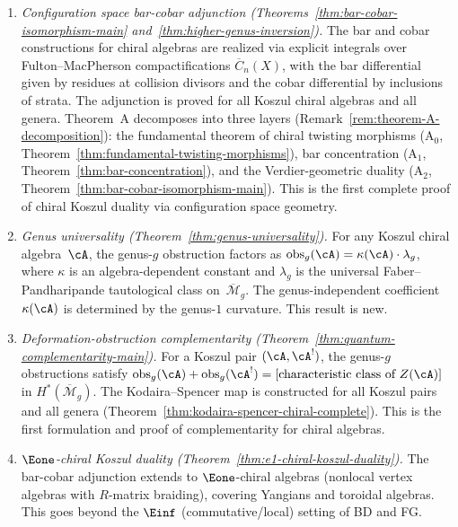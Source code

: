 \begin{enumerate}[label=\emph{(\arabic*)}]

\item \emph{Configuration space bar-cobar adjunction
  (Theorems~\ref{thm:bar-cobar-isomorphism-main}
  and~\ref{thm:higher-genus-inversion}).}
  The bar and cobar constructions for chiral algebras are realized
  via explicit integrals over Fulton--MacPherson compactifications
  $\overline{C}_n(X)$, with the bar differential given by residues
  at collision divisors and the cobar differential by inclusions
  of strata.  The adjunction is proved for all Koszul chiral algebras
  and all genera.  Theorem~A decomposes into three layers
  (Remark~\ref{rem:theorem-A-decomposition}):
  the fundamental theorem of chiral twisting morphisms
  ($\mathrm{A}_0$, Theorem~\ref{thm:fundamental-twisting-morphisms}),
  bar concentration
  ($\mathrm{A}_1$, Theorem~\ref{thm:bar-concentration}), and
  the Verdier-geometric duality
  ($\mathrm{A}_2$, Theorem~\ref{thm:bar-cobar-isomorphism-main}).
  This is the first complete proof of chiral Koszul
  duality via configuration space geometry.

\item \emph{Genus universality
  (Theorem~\ref{thm:genus-universality}).}
  For any Koszul chiral algebra~$\cA$, the genus-$g$ obstruction
  factors as $\mathrm{obs}_g(\cA) = \kappa(\cA) \cdot \lambda_g$,
  where $\kappa$ is an algebra-dependent constant and $\lambda_g$
  is the universal Faber--Pandharipande tautological class
  on~$\overline{\mathcal{M}}_g$.
  The genus-independent coefficient $\kappa(\cA)$ is determined
  by the genus-$1$ curvature.  This result is new.

\item \emph{Deformation-obstruction complementarity
  (Theorem~\ref{thm:quantum-complementarity-main}).}
  For a Koszul pair $(\cA, \cA^!)$, the genus-$g$ obstructions
  satisfy $\mathrm{obs}_g(\cA) + \mathrm{obs}_g(\cA^!) =
  [\text{characteristic class of } Z(\cA)]$ in $H^*(\overline{\mathcal{M}}_g)$.
  The Kodaira--Spencer map is constructed for all Koszul pairs
  and all genera (Theorem~\ref{thm:kodaira-spencer-chiral-complete}).
  This is the first formulation and proof of complementarity
  for chiral algebras.

\item \emph{$\Eone$-chiral Koszul duality
  (Theorem~\ref{thm:e1-chiral-koszul-duality}).}
  The bar-cobar adjunction extends to $\Eone$-chiral algebras
  (nonlocal vertex algebras with $R$-matrix braiding), covering
  Yangians and toroidal algebras.  This goes beyond the
  $\Einf$ (commutative/local) setting of BD and FG.


\end{enumerate}
